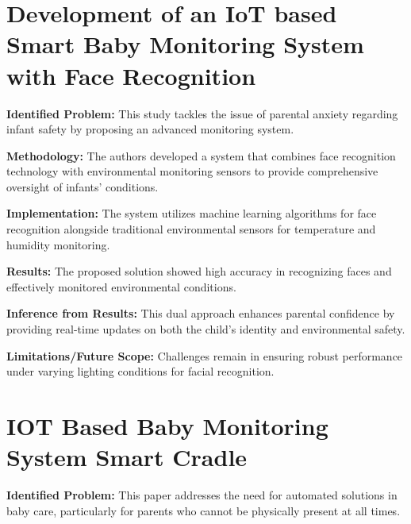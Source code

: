 \documentclass[12pt,a4paper]{report}
\begin{document}
\setlength{\parskip}{1em}  %


\section{Development of an IoT based Smart Baby Monitoring System with Face Recognition}
\textbf{Identified Problem: }This study tackles the issue of parental anxiety regarding infant safety by proposing an advanced monitoring system\cite{9454187}.
\setlength{\parskip}{1em}  %


\noindent\textbf{Methodology:} The authors developed a system that combines face recognition technology with environmental monitoring sensors to provide comprehensive oversight of infants' conditions.

\setlength{\parskip}{1em}  %


\noindent\textbf{Implementation:} The system utilizes machine learning algorithms for face recognition alongside traditional environmental sensors for temperature and humidity monitoring.

\setlength{\parskip}{1em}  %

\noindent\textbf{Results:}  The proposed solution showed high accuracy in recognizing faces and effectively monitored environmental conditions.

\setlength{\parskip}{1em}  %


\noindent\textbf{Inference from Results:} This dual approach enhances parental confidence by providing real-time updates on both the child's identity and environmental safety.

\setlength{\parskip}{1em}  %

\noindent\textbf{Limitations/Future Scope:} Challenges remain in ensuring robust performance under varying lighting conditions for facial recognition.
\setlength{\parskip}{1em}  %


\section{IOT Based Baby Monitoring System Smart Cradle}
\textbf{Identified Problem: }This paper addresses the need for automated solutions in baby care, particularly for parents who cannot be physically present at all times\cite{9442022}.
\end{document}
